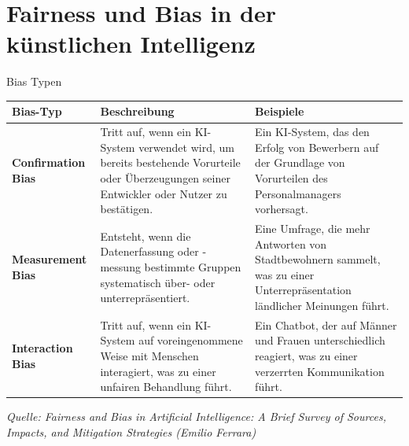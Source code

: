 \documentclass[aspectratio=169]{beamer}
\begin{document}
\section{Fairness und Bias in der künstlichen Intelligenz}


\begin{frame}[shrink]{Bias Typen}
    \small
    \renewcommand{\arraystretch}{1.5}
    \begin{center}
        \begin{tabular}{|p{}|p{}|p{}|}
            \hline
            \textbf{Bias-Typ} & \textbf{Beschreibung} & \textbf{Beispiele} \\
            \hline
            \textbf{Confirmation Bias} & Tritt auf, wenn ein KI-System verwendet wird, um bereits bestehende Vorurteile oder Überzeugungen seiner Entwickler oder Nutzer zu bestätigen. & Ein KI-System, das den Erfolg von Bewerbern auf der Grundlage von Vorurteilen des Personalmanagers vorhersagt. \\
            \hline
            \textbf{Measurement Bias} & Entsteht, wenn die Datenerfassung oder -messung bestimmte Gruppen systematisch über- oder unterrepräsentiert. & Eine Umfrage, die mehr Antworten von Stadtbewohnern sammelt, was zu einer Unterrepräsentation ländlicher Meinungen führt. \\
            \hline
            \textbf{Interaction Bias} & Tritt auf, wenn ein KI-System auf voreingenommene Weise mit Menschen interagiert, was zu einer unfairen Behandlung führt. & Ein Chatbot, der auf Männer und Frauen unterschiedlich reagiert, was zu einer verzerrten Kommunikation führt. \\
            \hline
        \end{tabular}
    \end{center}
    
    \vspace{0.2cm}
    \tiny \textit{Quelle: Fairness and Bias in Artificial Intelligence: A Brief Survey of Sources, Impacts, and Mitigation Strategies (Emilio Ferrara)}
\end{frame}
\end{document}
